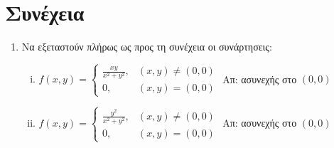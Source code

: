 \documentclass[a4paper,table]{report}
\begin{document}
\section*{Συνέχεια}

\begin{enumerate}
  \item Να εξεταστούν πλήρως ως προς τη συνέχεια οι συνάρτησεις:
    \begin{enumerate}[(i)]
      \item $ f(x,y) = 
        \begin{cases}
          \frac{ xy }{ x^{2} + y^{2} } ,& (x,y)\neq (0,0) \\
          0 ,& (x,y)= (0,0)
        \end{cases} $
        \hfill Απ: ασυνεχής στο $ (0,0) $ 

      \item $ f(x,y) = 
        \begin{cases} 
          \frac{y^{2}}{x^{2}+y^{2}}, & (x,y) 
          \neq (0,0) \\ 0, & (x,y) = (0,0)
        \end{cases} $
        \hfill Απ: ασυνεχής στο $ (0,0) $ 
    \end{enumerate}
\end{enumerate}
\end{document}
